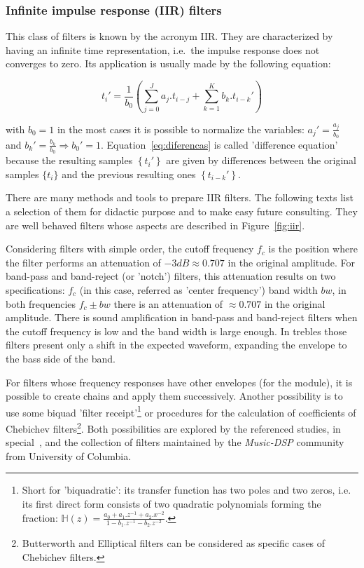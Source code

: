 \documentclass[
 aip,
 jmp,
 amsmath,amssymb,
 reprint,
]{revtex4-1}
\begin{document}
\subsubsection{Infinite impulse response (IIR) filters}

This class of filters is known by the acronym IIR. They are characterized by having an infinite time representation, i.e.\ the impulse response does not converges to zero. Its application is usually made by the following equation:

\begin{equation}\label{eq:diferencas}
 t_i' = \frac{1}{b_0}\left ( \sum_{j=0}^Ja_j . t_{i-j} + \sum_{k=1}^Kb_k . t_{i-k}' \right )
\end{equation}

\noindent with $b_0=1$ in the most cases it is possible to normalize the variables: $a_j'=\frac{a_j}{b_0}$ and $b_k'=\frac{b_k}{b_0} \Rightarrow b_0' = 1$.
Equation~\ref{eq:diferencas} is called 'difference equation' because the resulting samples $\left\{t_i'\right\}$ are given by differences between the original samples $\{t_i\}$ and the previous resulting ones $\left\{t_{i-k}'\right\}$.

There are many methods and tools to prepare IIR filters. The following texts list a selection of them for didactic purpose and to make easy future consulting. They are well behaved filters whose aspects are described in Figure~\ref{fig:iir}.

Considering filters with simple order, the cutoff frequency $f_c$ is the position where the filter performs an attenuation of $-3dB \approx 0.707 $ in the original amplitude.
For band-pass and band-reject (or 'notch') filters, this attenuation results on two specifications: $f_c$ (in this case, referred as 'center frequency') band width $bw$,
in both frequencies $f_c \pm bw$ there is an attenuation of $\approx 0.707$ in the original amplitude.
There is sound amplification in band-pass and band-reject filters when the cutoff frequency is low and the band width is large enough. In trebles those filters present only a shift in the expected waveform, expanding the envelope to the bass side of the band.

For filters whose frequency responses have other envelopes (for the module), it is possible to create chains and apply them successively. Another possibility is to use some biquad 'filter receipt'\footnote{Short for 'biquadratic': its transfer function has two poles and two zeros, i.e. its first direct form consists of two quadratic polynomials forming the fraction: $\mathbb{H}(z)=\frac{a_0+a_1.z^{-1}+a_2.x^{-2}}{1- b_1.z^{-1} -b_2 . z^{-2}}$.} or procedures for the calculation of coefficients of Chebichev filters\footnote{Butterworth and Elliptical filters can be considered as specific cases of Chebichev filters.\cite{Openheim,smith}}.
Both possibilities are explored by the referenced studies, in special~\cite{JOSFM,smith}, and the collection of filters maintained by the \emph{Music-DSP} community from University of Columbia.\cite{music-dsp,Openheim}
\end{document}
